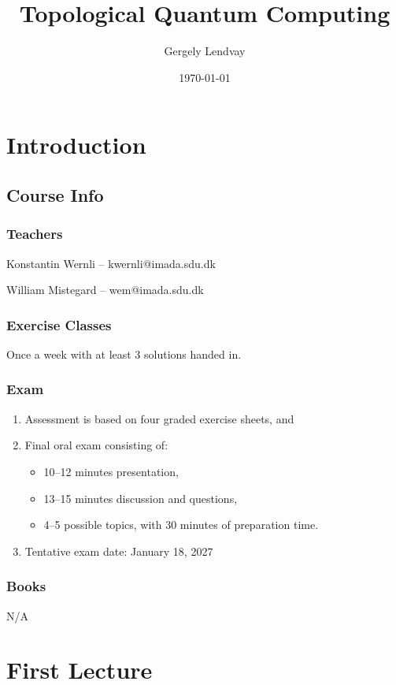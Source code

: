 \documentclass[a4paper,oneside,11pt]{article}
\title{Topological Quantum Computing}
\author{Gergely Lendvay}
\date{\today}
\begin{document}
\maketitle\clearpage

\tableofcontents\clearpage

\newpage\section*{Introduction}
\subsection{Course Info}
\subsubsection{Teachers}
\noindent Konstantin Wernli -- kwernli@imada.sdu.dk

\noindent William Mistegard -- wem@imada.sdu.dk

\subsubsection{Exercise Classes}
Once a week with at least 3 solutions handed in.

\subsubsection{Exam}
\begin{enumerate}
    \item Assessment is based on four graded exercise sheets, and
    \item Final oral exam consisting of:
    \begin{itemize}
        \item 10--12 minutes presentation,
        \item 13--15 minutes discussion and questions,
        \item 4--5 possible topics, with 30 minutes of preparation time.
    \end{itemize}
    \item Tentative exam date: January 18, 2027
\end{enumerate}

\subsubsection{Books}
N/A

\newpage\section{First Lecture}
\end{document}
